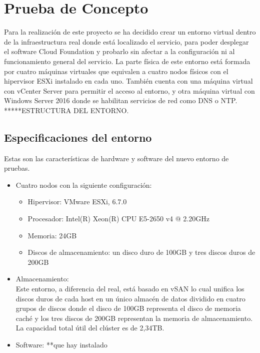 
\section{Prueba de Concepto}
Para la realización de este proyecto se ha decidido crear un entorno virtual dentro de la infraestructura real donde está localizado el servicio, para poder desplegar el software Cloud Foundation y probarlo sin afectar a la configuración ni al funcionamiento general del servicio. La parte física de este entorno está formada por cuatro máquinas virtuales que equivalen a cuatro nodos físicos con el hipervisor ESXi instalado en cada uno. También cuenta con una máquina virtual con vCenter Server para permitir el acceso al entorno, y otra máquina virtual con Windows Server 2016 donde se habilitan servicios de red como DNS o NTP.
*****ESTRUCTURA DEL ENTORNO.
\subsection{Especificaciones del entorno}
Estas son las características de hardware y software del nuevo entorno de pruebas.
\begin{itemize}
    \item Cuatro nodos con la siguiente configuración:
    \begin{itemize}
        \item Hipervisor: VMware ESXi, 6.7.0
        \item Procesador: Intel(R) Xeon(R) CPU E5-2650 v4 @ 2.20GHz
        \item Memoria: 24GB
        \item Discos de almacenamiento: un disco duro de 100GB y tres discos duros de 200GB
    \end{itemize}
    \item Almacenamiento: \\
        Este entorno, a diferencia del real, está basado en vSAN lo cual unifica los discos duros de cada host en un único almacén de datos dividido en cuatro grupos de discos donde el disco de 100GB representa el disco de memoria caché y los tres discos de 200GB representan la memoria de almacenamiento. La capacidad total útil del clúster es de 2,34TB.
    \item Software:
    **que hay instalado
\end{itemize}
